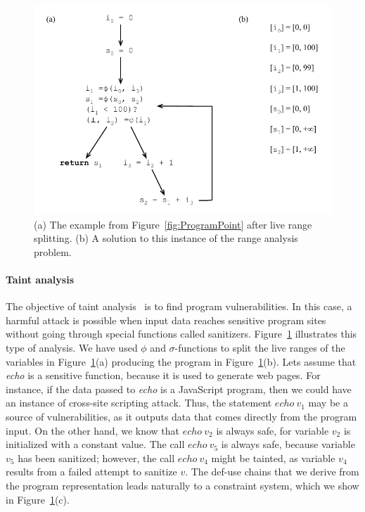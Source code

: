 \begin{figure}[t!]
\centering
\includegraphics[width=\linewidth]{RangeAnalysis}
\caption{(a) The example from Figure~\ref{fig:ProgramPoint} after live range splitting.
(b) A solution to this instance of the range analysis problem.}
\label{fig:taintAnalysis}
\end{figure}


\paragraph{Taint analysis} The objective of taint analysis~\cite{Rimsa11} is to find program vulnerabilities.
In this case, a harmful attack is possible when input data reaches sensitive program sites without going through special functions called sanitizers.
Figure~\ref{fig:taintAnalysis} illustrates this type of analysis.
We have used $\phi$ and $\sigma$-functions to split the live ranges of the variables in Figure~\ref{fig:taintAnalysis}(a) producing the program in Figure~\ref{fig:taintAnalysis}(b).
Lets assume that {\em echo} is a sensitive function, because it is used to generate web pages.
For instance, if the data passed to {\em echo} is a JavaScript program, then we could have an instance of cross-site scripting attack.
Thus, the statement $\mathit{echo} \ v_1$ may be a source of vulnerabilities, as it outputs data that comes directly from the program input.
On the other hand, we know that $\mathit{echo} \ v_2$ is always safe, for variable $v_2$ is initialized with a constant value.
The call $\mathit{echo} \ v_5$ is always safe, because variable $v_5$ has been sanitized; however, the call $\mathit{echo} \ v_4$ might be tainted, as variable $v_4$ results from a failed attempt to sanitize $v$.
The def-use chains that we derive from the program representation leads naturally to a constraint system, which we show in  Figure~\ref{fig:taintAnalysis}(c).

